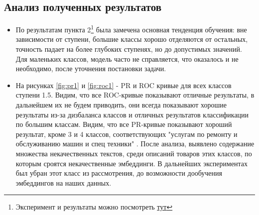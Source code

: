 \documentclass{article}
\begin{document}
\subsection{Анализ полученных результатов}
\begin{itemize}
    \item По результатам пункта 2\footnote{Эксперимент и результаты можно посмотреть \href{ https://github.com/intsystems/2024-Project-142/blob/master/code/33_45_81_86_full_train_45\%3Dbad.ipynb }{тут}} была замечена основная тенденция обучения: вне зависимости от ступени, большие классы хорошо отделяются от остальных, точность падает на более глубоких ступенях, но до допустимых значений. Для маленьких классов, модель часто не справляется, что оказалось и не необходимо, после уточнения постановки задачи.
    \item На рисунках \ref{fig:pr1} и \ref{fig:roc1} - PR и ROC кривые для всех классов ступени 1.5. Видим, что все ROC-кривые показывают отличные результаты, в дальнейшем их не будем приводить, они всегда показывают хорошие результаты из-за дизбаланса классов и отличных результатов классификации по большим классам. Видим, что все PR-кривые показывают хороший результат, кроме 3 и 4 классов, соответствующих "услугам по ремонту и обслуживанию машин и спец техники" . После анализа, выявлено содержание множества некачественных текстов, среди описаний товаров этих классов, по которым сроятся некачественные эмбеддинги. В дальнейших экспериментах был убран этот класс из рассмотрения, до возможности дообучения эмбеддингов на наших данных.
    
\end{itemize}
\end{document}
